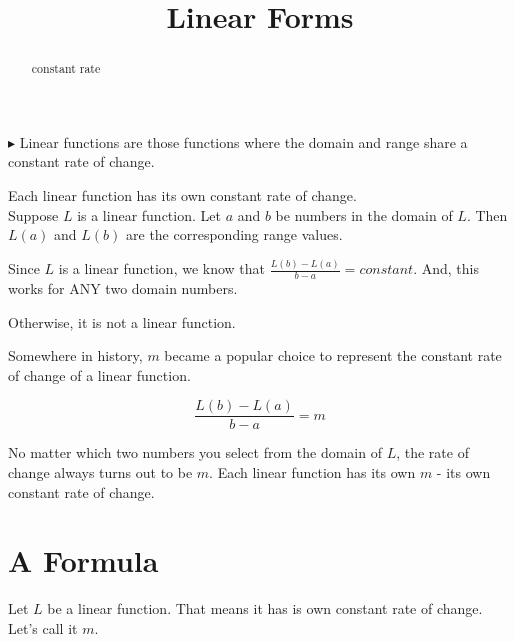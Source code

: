 \documentclass{ximera}
\title{Linear Forms}
\begin{document}
\begin{abstract}
constant rate
\end{abstract}
\maketitle










$\blacktriangleright$  Linear functions are those functions where the domain and range share a constant rate of change.  





Each linear function has its own constant rate of change. \\


Suppose $L$ is a linear function.  Let $a$ and $b$ be numbers in the domain of $L$.  Then $L(a)$ and $L(b)$ are the corresponding range values.

Since $L$ is a linear function, we know that $\frac{L(b) - L(a)}{b - a} = constant$.  And, this works for ANY two domain numbers.

Otherwise, it is not a linear function.







Somewhere in history, $m$ became a popular choice to represent the constant rate of change of a linear function.



\[
\frac{L(b) - L(a)}{b - a} = m
\]





No matter which two numbers you select from the domain of $L$, the rate of change always turns out to be $m$.  Each linear function has its own $m$ - its own constant rate of change.












\section{A Formula}

Let $L$ be a linear function.  That means it has is own constant rate of change.  Let's call it $m$. \\
\end{document}
